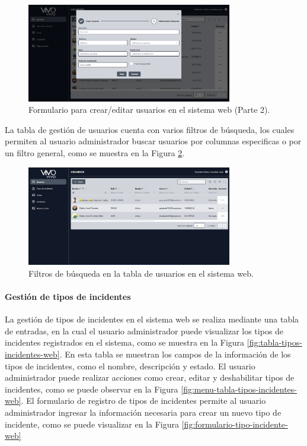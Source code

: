\begin{figure}[H]
    \centering
    \includegraphics[width=0.8\textwidth]{chapters/III-resultados-y-discusion/resources/images/formulario-usuario-web-2.png}
    \caption{Formulario para crear/editar usuarios en el sistema web (Parte 2).}
    \label{fig:formulario-usuario-web-2}
\end{figure}

La tabla de gestión de usuarios cuenta con varios filtros de búsqueda, los cuales permiten al usuario administrador buscar usuarios por
columnas especificas o por un filtro general, como se muestra en la Figura \ref{fig:filtros-tabla-usuarios-web}.

\begin{figure}[H]
    \centering
    \includegraphics[width=0.8\textwidth]{chapters/III-resultados-y-discusion/resources/images/filtros-tabla-usuarios-web.png}
    \caption{Filtros de búsqueda en la tabla de usuarios en el sistema web.}
    \label{fig:filtros-tabla-usuarios-web}
\end{figure}

\paragraph{Gestión de tipos de incidentes}
La gestión de tipos de incidentes en el sistema web se realiza mediante una tabla de entradas, en la cual el usuario administrador
puede visualizar los tipos de incidentes registrados en el sistema, como se muestra en la Figura \ref{fig:tabla-tipos-incidentes-web}.
En esta tabla se muestran los campos de la información de los tipos de incidentes, como el nombre, descripción y estado. El usuario
administrador puede realizar acciones como crear, editar y deshabilitar tipos de incidentes, como se puede observar en la Figura
\ref{fig:menu-tabla-tipos-incidentes-web}. El formulario de registro de tipos de incidentes permite al usuario administrador ingresar
la información necesaria para crear un nuevo tipo de incidente, como se puede visualizar en la Figura \ref{fig:formulario-tipo-incidente-web}

